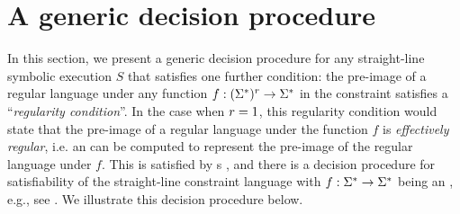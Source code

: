 

\section{A generic decision procedure} \label{sec:algo}


In this section, we present a generic decision procedure for any
straight-line symbolic execution $S$
that satisfies one further condition:
the pre-image of a regular language under any function 
$f: (\Sigma^*)^r \to \Sigma^*$ in the constraint satisfies a 
``\emph{regularity condition}''.
In the case when $r=1$, this regularity condition would state that the pre-image
of a regular language under the function $f$ is \emph{effectively regular}, i.e. an \FA{} can be computed to represent the pre-image of the regular language under $f$. This is
satisfied by \FT{}s \cite{Berstel,BG07,BG08}, and there is
a decision procedure for satisfiability of the straight-line constraint
language %
with $f: \Sigma^* \to \Sigma^*$ being an \FT{}, e.g., see 
\cite{LB16,BG07,BG08}. %
We illustrate this decision procedure below.

